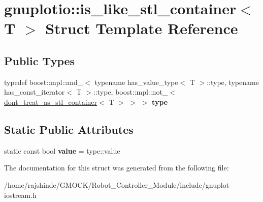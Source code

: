 \hypertarget{structgnuplotio_1_1is__like__stl__container}{}\section{gnuplotio\+:\+:is\+\_\+like\+\_\+stl\+\_\+container$<$ T $>$ Struct Template Reference}
\label{structgnuplotio_1_1is__like__stl__container}
\subsection*{Public Types}
\begin{DoxyCompactItemize}
\item 
typedef boost\+::mpl\+::and\+\_\+$<$ typename has\+\_\+value\+\_\+type$<$ T $>$\+::type, typename has\+\_\+const\+\_\+iterator$<$ T $>$\+::type, boost\+::mpl\+::not\+\_\+$<$ \hyperlink{structgnuplotio_1_1dont__treat__as__stl__container}{dont\+\_\+treat\+\_\+as\+\_\+stl\+\_\+container}$<$ T $>$ $>$ $>$ {\bfseries type}\hypertarget{structgnuplotio_1_1is__like__stl__container_a050ecfa55e896a27f86d901334f47c6a}{}\label{structgnuplotio_1_1is__like__stl__container_a050ecfa55e896a27f86d901334f47c6a}

\end{DoxyCompactItemize}
\subsection*{Static Public Attributes}
\begin{DoxyCompactItemize}
\item 
static const bool {\bfseries value} = type\+::value\hypertarget{structgnuplotio_1_1is__like__stl__container_ae4761e6e807deed732e41118c785c8a4}{}\label{structgnuplotio_1_1is__like__stl__container_ae4761e6e807deed732e41118c785c8a4}

\end{DoxyCompactItemize}


The documentation for this struct was generated from the following file\+:\begin{DoxyCompactItemize}
\item 
/home/rajshinde/\+G\+M\+O\+C\+K/\+Robot\+\_\+\+Controller\+\_\+\+Module/include/gnuplot-\/iostream.\+h\end{DoxyCompactItemize}
